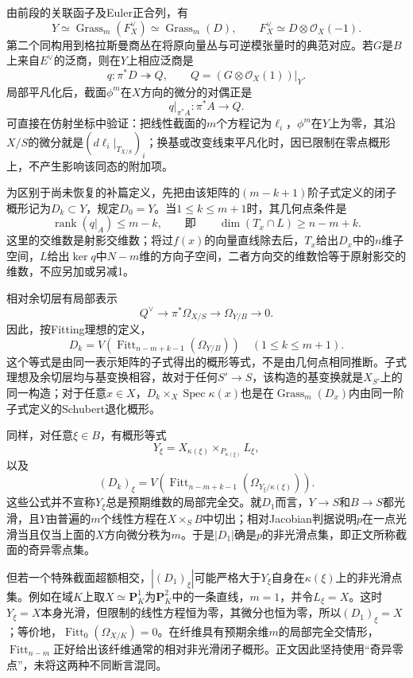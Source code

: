\documentclass[UTF8,a4paper]{ctexbook}
\DeclareMathOperator{\Spec}{Spec}
\begin{document}
由前段的关联函子及Euler正合列，有
\[
Y\simeq\operatorname{Grass}_{m}(F_X^\vee)
\simeq\operatorname{Grass}_{m}(D),
\qquad F_X^\vee\simeq D\otimes\mathcal O_X(-1).
\]
第二个同构用到格拉斯曼商丛在将原向量丛与可逆模张量时的典范对应。若$G$是$B$上来自$E^\vee$的泛商，则在$Y$上相应泛商是
\[
q\colon\pi^*D\twoheadrightarrow Q,
\qquad Q=(G\otimes\mathcal O_X(1))|_Y.
\]
局部平凡化后，截面$\phi^m$在$X$方向的微分的对偶正是
\[
q|_{\pi^*A}\colon\pi^*A\longrightarrow Q.
\]
可直接在仿射坐标中验证：把线性截面的$m$个方程记为$\ell_i$，$\phi^m$在$Y$上为零，其沿$X/S$的微分就是$(d\ell_i|_{T_{X/S}})_i$；换基或改变线束平凡化时，因已限制在零点概形上，不产生影响该同态的附加项。

为区别于尚未恢复的补篇定义，先把由该矩阵的$(m-k+1)$阶子式定义的闭子概形记为$D_k\subset Y$，规定$D_0=Y$。当$1\leq k\leq m+1$时，其几何点条件是
\[
\operatorname{rank}(q|_A)\leq m-k,
\qquad\text{即}\qquad
\dim(T_x\cap L)\geq n-m+k.
\]
这里的交维数是射影交维数；将过$f(x)$的向量直线除去后，$T_x$给出$D_x$中的$n$维子空间，$L$给出$\ker q$中$N-m$维的方向子空间，二者方向交的维数恰等于原射影交的维数，不应另加或另减1。

相对余切层有局部表示
\[
Q^\vee\longrightarrow\pi^*\Omega_{X/S}
\longrightarrow\Omega_{Y/B}\longrightarrow0.
\]
因此，按Fitting理想的定义，
\[
D_k
=V\!\left(\operatorname{Fitt}_{n-m+k-1}
                 (\Omega_{Y/B})\right)
\quad(1\leq k\leq m+1).
\]
这个等式是由同一表示矩阵的子式得出的概形等式，不是由几何点相同推断。子式理想及余切层均与基变换相容，故对于任何$S'\to S$，该构造的基变换就是$X_{S'}$上的同一构造；对于任意$x\in X$，$D_k\times_X\Spec\kappa(x)$也是在$\operatorname{Grass}_{m}(D_x)$内由同一阶子式定义的Schubert退化概形。

同样，对任意$\xi\in B$，有概形等式
\[
Y_\xi=X_{\kappa(\xi)}\times_{P_{\kappa(\xi)}}L_\xi,
\]
以及
\[
(D_k)_\xi
=V\!\left(\operatorname{Fitt}_{n-m+k-1}
                 (\Omega_{Y_\xi/\kappa(\xi)})\right).
\]
这些公式并不宣称$Y_\xi$总是预期维数的局部完全交。就$D_1$而言，$Y\to S$和$B\to S$都光滑，且$Y$由普遍的$m$个线性方程在$X\times_SB$中切出；相对Jacobian判据说明$p$在一点光滑当且仅当上面的$X$方向微分秩为$m$。于是$|D_1|$确是$p$的非光滑点集，即正文所称截面的奇异零点集。

但若一个特殊截面超额相交，$|(D_1)_\xi|$可能严格大于$Y_\xi$自身在$\kappa(\xi)$上的非光滑点集。例如在域$K$上取$X\simeq\mathbf P^1_K$为$\mathbf P^2_K$中的一条直线，$m=1$，并令$L_\xi=X$。这时$Y_\xi=X$本身光滑，但限制的线性方程恒为零，其微分也恒为零，所以$(D_1)_\xi=X$；等价地，$\operatorname{Fitt}_0(\Omega_{X/K})=0$。在纤维具有预期余维$m$的局部完全交情形，$\operatorname{Fitt}_{n-m}$正好给出该纤维通常的相对非光滑闭子概形。正文因此坚持使用“奇异零点”，未将这两种不同断言混同。
\end{document}
